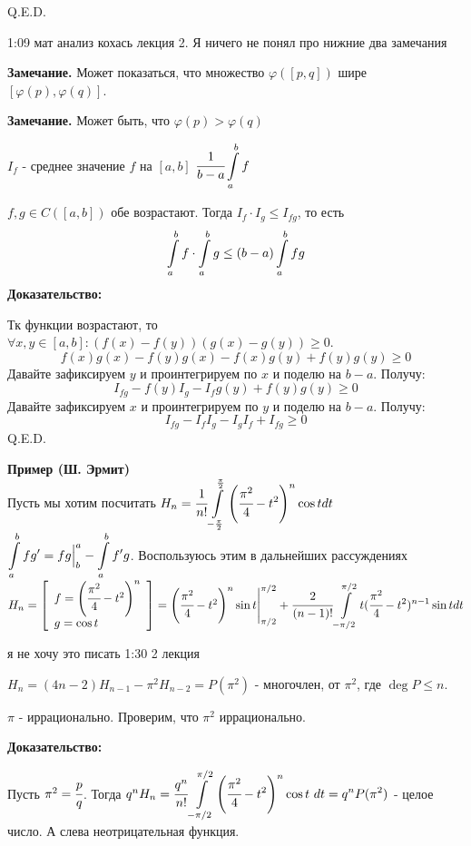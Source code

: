  \hfill Q.E.D.

1:09 мат анализ кохась лекция 2. Я ничего не понял про нижние два замечания


 \textbf{Замечание.} Может показаться, что множество $\varphi([p,q])$ шире $[\varphi(p),\varphi(q)]$. 

 \textbf{Замечание.} Может быть, что $\varphi(p) > \varphi(q)$

$I_f$ - среднее значение $f$  на $[a,b]$  $\cfrac{1}{b-a}\displaystyle\int\limits_{a}^{b}f$
 

 $f,g \in C([a,b])$ обе возрастают. Тогда $I_f \cdot I_g \leq I_{fg}$, то есть
$$\displaystyle\int\limits_{a}^{b}f \cdot \displaystyle\int\limits_{a}^{b}g\leq (b-a)\displaystyle\int\limits_{a}^{b}fg$$
\textbf{Доказательство:}

Тк функции возрастают, то $\forall x,y \in [a,b]: (f(x)-f(y))(g(x) - g(y))\geq 0$.
$$f(x)g(x)-f(y)g(x)-f(x)g(y) + f(y)g(y) \geq 0$$ 
Давайте зафиксируем $y$ и проинтегрируем по $x$ и поделю на $b-a$. Получу:
$$I_{fg} - f(y) I_g - I_f g(y) + f(y)g(y)\geq 0 $$
Давайте зафиксируем $x$ и проинтегрируем по $y$ и поделю на $b-a$. Получу:
$$I_{fg}-I_fI_g -I_gI_f + I_{fg} \geq 0$$
\hfill Q.E.D.

\textbf{Пример (Ш. Эрмит)} \\
Пусть мы хотим посчитать $H_n = \cfrac{1}{n!}\displaystyle\int\limits_{-\frac{\pi}{2}}^{\frac{\pi}{2}} \left(\cfrac{\pi^2}{4}-t^2\right)^n \cos t dt$\\
$\displaystyle\int\limits_{a}^{b}fg' = fg\Big|^a_b - \displaystyle\int\limits_{a}^{b}f'g$. Воспользуюсь этим в дальнейших рассуждениях\\
$H_n =\left [ \begin{array}{l}
    f = \left(\cfrac{\pi^2}{4}-t^2\right)^n\\  
     g = \cos t 
\end{array}\right] =\left(\cfrac{\pi^2}{4}-t^2\right)^n \sin t\Bigg|^{\pi/2}_{\pi/2} + \cfrac{2}{(n-1)!}\displaystyle\int\limits_{-\pi/2}^{\pi/2}t(\cfrac{\pi^2}{4}-t^2)^{n-1}\sin t dt $

я не хочу это писать 1:30 2 лекция

$H_n = (4n-2)H_{n-1} - \pi^2H_{n-2} = P(\pi^2)$ - многочлен, от $\pi^2$, где $\deg P\leq n$.


$\pi$ - иррационально. Проверим, что $\pi^2$ иррационально. 

\textbf{Доказательство:}

Пусть $\pi^2 = \cfrac{p}{q}$. Тогда $q^nH_n=\cfrac{q^n}{n!}\displaystyle\int\limits_{-\pi/2}^{\pi/2}\left(\cfrac{\pi^2}{4}-t^2\right)^n \cos t \,\, dt = q^n P(\pi^2)$ - целое число. А слева неотрицательная функция.

